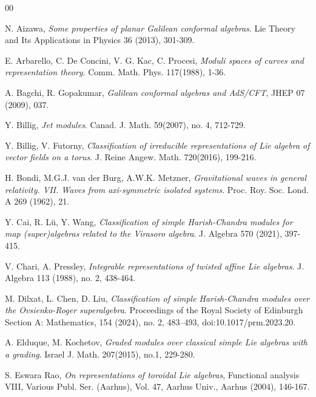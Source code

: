 \documentclass[1p]{elsarticle}
\numberwithin{equation}{section}
\begin{document}



\begin{thebibliography}{00}


 N. Aizawa, {\it Some properties of planar Galilean conformal algebras}. Lie Theory and Its Applications in
Physics 36 (2013), 301-309.

 E. Arbarello, C. De Concini, V. G. Kac, C. Procesi, {\it Moduli spaces of curves and representation theory}. Comm. Math. Phys. 117(1988), 1-36.

 A. Bagchi, R. Gopakumar, {\it Galilean conformal algebras and AdS/CFT}, JHEP 07 (2009), 037. 

 Y. Billig, {\it Jet modules}. Canad. J. Math. 59(2007), no. 4, 712-729.



 Y. Billig, V. Futorny,  {\it Classification of irreducible representations of Lie algebra of vector fields on a torus}.
J. Reine Angew. Math. 720(2016), 199-216.


  H. Bondi, M.G.J. van der Burg, A.W.K. Metzner, {\it Gravitational waves in general relativity. VII. Waves from axi-symmetric isolated systems}. Proc. Roy. Soc. Lond. A 269 (1962), 21.
 
 Y. Cai, R. L\"u, Y. Wang, {\it Classification of simple Harish-Chandra modules for map (super)algebras related to the Virasoro algebra}. J. Algebra 570 (2021), 397-415.

 V. Chari, A. Pressley, {\it Integrable representations of twisted affine Lie algebras}. J. Algebra 113 (1988), no. 2, 438-464.

 M. Dilxat, L. Chen, D. Liu, {\it Classification of simple Harish-Chandra modules over the Ovsienko-Roger superalgebra}. Proceedings of the Royal Society of Edinburgh Section A: Mathematics,  154 (2024), no. 2, 483–493, doi:10.1017/prm.2023.20.

 A. Elduque, M. Kochetov, {\it Graded modules over classical simple Lie algebras with a grading}. Israel J. Math. 207(2015), no.1, 229-280.


  S. Eswara Rao, {\it On representations of toroidal Lie algebras}, Functional analysis VIII, Various Publ. Ser. (Aarhus), Vol. 47, Aarhus Univ., Aarhus (2004), 146-167.


\end{thebibliography}
\end{document}
